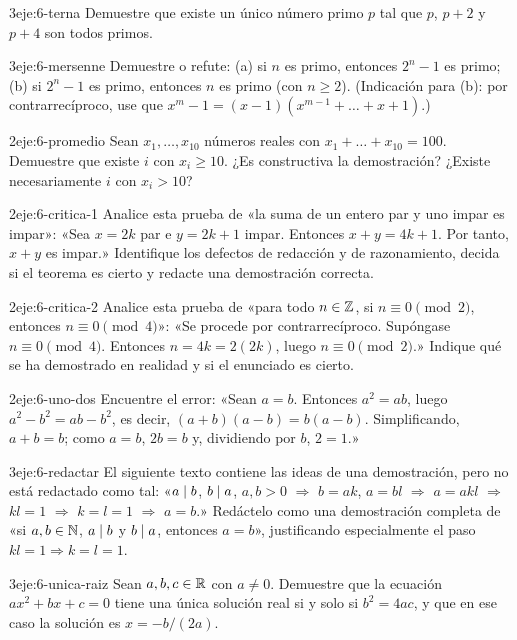 \begin{ejercicio}{3}{eje:6-terna}
Demuestre que existe un único número primo $p$ tal que $p$, $p+2$ y $p+4$ son todos primos.
\end{ejercicio}

\begin{ejercicio}{3}{eje:6-mersenne}
Demuestre o refute: (a) si $n$ es primo, entonces $2^{n}-1$ es primo; (b) si $2^{n}-1$ es primo, entonces $n$ es primo (con $n\ge 2$). (Indicación para (b): por contrarrecíproco, use que $x^{m}-1=(x-1)(x^{m-1}+\dots+x+1)$.)
\end{ejercicio}

\begin{ejercicio}{2}{eje:6-promedio}
Sean $x_1,\dots,x_{10}$ números reales con $x_1+\dots+x_{10}=100$. Demuestre que existe $i$ con $x_i\ge 10$. ¿Es constructiva la demostración? ¿Existe necesariamente $i$ con $x_i>10$?
\end{ejercicio}

\begin{ejercicio}{2}{eje:6-critica-1}
Analice esta prueba de «la suma de un entero par y uno impar es impar»: «Sea $x=2k$ par e $y=2k+1$ impar. Entonces $x+y=4k+1$. Por tanto, $x+y$ es impar.» Identifique los defectos de redacción y de razonamiento, decida si el teorema es cierto y redacte una demostración correcta.
\end{ejercicio}

\begin{ejercicio}{2}{eje:6-critica-2}
Analice esta prueba de «para todo $n\in\mathbb{Z}$, si $n\equiv 0\pmod 2$, entonces $n\equiv 0\pmod 4$»: «Se procede por contrarrecíproco. Supóngase $n\equiv 0\pmod 4$. Entonces $n=4k=2(2k)$, luego $n\equiv 0\pmod 2$.» Indique qué se ha demostrado en realidad y si el enunciado es cierto.
\end{ejercicio}

\begin{ejercicio}{2}{eje:6-uno-dos}
Encuentre el error: «Sean $a=b$. Entonces $a^{2}=ab$, luego $a^{2}-b^{2}=ab-b^{2}$, es decir, $(a+b)(a-b)=b(a-b)$. Simplificando, $a+b=b$; como $a=b$, $2b=b$ y, dividiendo por $b$, $2=1$.»
\end{ejercicio}

\begin{ejercicio}{3}{eje:6-redactar}
El siguiente texto contiene las ideas de una demostración, pero no está redactado como tal: «$a\mid b$, $b\mid a$, $a,b>0$ $\Rightarrow$ $b=ak$, $a=bl$ $\Rightarrow$ $a=akl$ $\Rightarrow$ $kl=1$ $\Rightarrow$ $k=l=1$ $\Rightarrow$ $a=b$.» Redáctelo como una demostración completa de «si $a,b\in\mathbb{N}$, $a\mid b$ y $b\mid a$, entonces $a=b$», justificando especialmente el paso $kl=1\Rightarrow k=l=1$.
\end{ejercicio}

\begin{ejercicio}{3}{eje:6-unica-raiz}
Sean $a,b,c\in\mathbb{R}$ con $a\neq 0$. Demuestre que la ecuación $ax^{2}+bx+c=0$ tiene una única solución real si y solo si $b^{2}=4ac$, y que en ese caso la solución es $x=-b/(2a)$.
\end{ejercicio}
